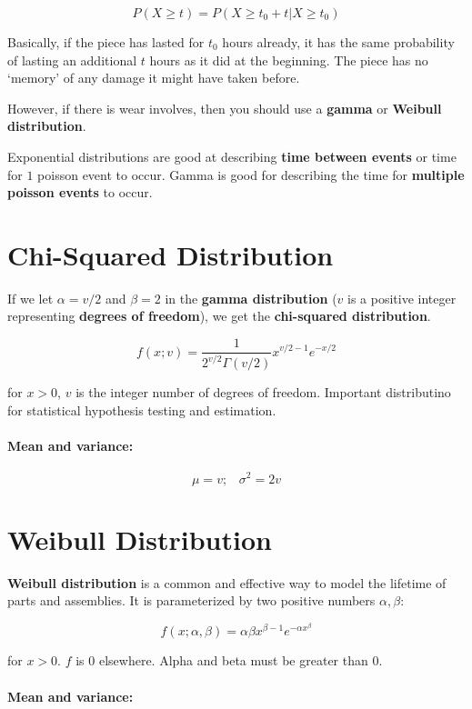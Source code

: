 \documentclass[a4paper,12pt]{report}
\begin{document}
$$P(X \geq t) = P(X \geq t_0 + t | X \geq t_0)$$

Basically, if the piece has lasted for $t_0$ hours already, it has the same probability of lasting an additional $t$ hours as it did at the beginning. The piece has no `memory' of any damage it 
might have taken before.

However, if there is wear involves, then you should use a \textbf{gamma} or \textbf{Weibull distribution}. 

Exponential distributions are good at describing \textbf{time between events} or time for $1$ poisson event to occur. Gamma is good for describing the time for \textbf{multiple poisson events} to occur.


\section{Chi-Squared Distribution}

If we let $\alpha = v / 2$ and $\beta = 2$ in the \textbf{gamma distribution} ($v$ is a positive integer representing \textbf{degrees of freedom}), we get the \textbf{chi-squared distribution}. 

$$f(x; v) = \frac{1}{2^{v/2}\Gamma(v/2)} x^{v/2 - 1} e^{-x/2}$$

for $x > 0$, $v$ is the integer number of degrees of freedom. Important distributino for statistical hypothesis testing and estimation.

\paragraph{Mean and variance: } 

$$\mu = v;\,\,\,\,\, \sigma^2 = 2v$$

\section{Weibull Distribution}

\textbf{Weibull distribution} is a common and effective way to model the lifetime of parts and assemblies. It is parameterized by two positive numbers $\alpha, \beta$:

$$f(x; \alpha, \beta) = \alpha \beta x^{\beta - 1} e^{-\alpha x ^ \beta}$$

for $x > 0$. $f$ is 0 elsewhere. Alpha and beta must be greater than 0.

\paragraph{Mean and variance: } 
\end{document}
